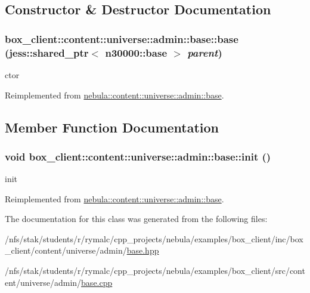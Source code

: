 \subsection{Constructor \& Destructor Documentation}
\hypertarget{classbox__client_1_1content_1_1universe_1_1admin_1_1base_a85bffca5e38b5fa3e24d8608b2a00166}{
\subsubsection[{base}]{\setlength{\rightskip}{0pt plus 5cm}box\_\-client::content::universe::admin::base::base (jess::shared\_\-ptr$<$ {\bf n30000::base} $>$ {\em parent})}}
\label{classbox__client_1_1content_1_1universe_1_1admin_1_1base_a85bffca5e38b5fa3e24d8608b2a00166}


ctor 

Reimplemented from \hyperlink{classnebula_1_1content_1_1universe_1_1admin_1_1base_a51a5e35a87bec6f83bf42ce118011fda}{nebula::content::universe::admin::base}.

\subsection{Member Function Documentation}
\hypertarget{classbox__client_1_1content_1_1universe_1_1admin_1_1base_a9a49454fde89dacb9318efaa72532505}{
\subsubsection[{init}]{\setlength{\rightskip}{0pt plus 5cm}void box\_\-client::content::universe::admin::base::init ()}}
\label{classbox__client_1_1content_1_1universe_1_1admin_1_1base_a9a49454fde89dacb9318efaa72532505}


init 

Reimplemented from \hyperlink{classnebula_1_1content_1_1universe_1_1admin_1_1base_a9f4f3553a746519a33bc9357880c200c}{nebula::content::universe::admin::base}.

The documentation for this class was generated from the following files:\begin{DoxyCompactItemize}
\item 
/nfs/stak/students/r/rymalc/cpp\_\-projects/nebula/examples/box\_\-client/inc/box\_\-client/content/universe/admin/\hyperlink{examples_2box__client_2inc_2box__client_2content_2universe_2admin_2base_8hpp}{base.hpp}\item 
/nfs/stak/students/r/rymalc/cpp\_\-projects/nebula/examples/box\_\-client/src/content/universe/admin/\hyperlink{examples_2box__client_2src_2content_2universe_2admin_2base_8cpp}{base.cpp}\end{DoxyCompactItemize}
